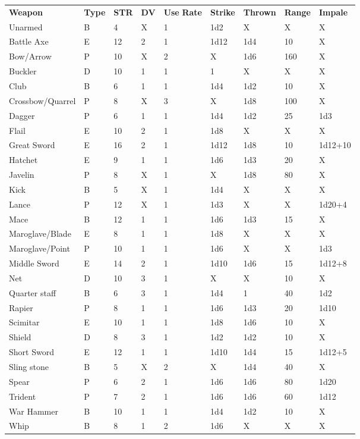 \begin{tcolorbox}[breakable,boxrule=0pt,title=\textbf{Weapon Effects}]
\begin{tabular}{l l l l l l l l l}
\textbf{Weapon} & \textbf{Type} & \textbf{STR} & \textbf{DV} & \textbf{Use} \textbf{Rate} & \textbf{Strike} & \textbf{Thrown} & \textbf{Range} & \textbf{Impale}\\
Unarmed & B & 4 & X & 1 & 1d2 & X & X & X\\
Battle Axe & E & 12 & 2 & 1 & 1d12 & 1d4 & 10 & X\\
Bow/Arrow & P & 10 & X & 2 & X & 1d6 & 160 & X\\
Buckler & D & 10 & 1 & 1 & 1 & X & X & X\\
Club & B & 6 & 1 & 1 & 1d4 & 1d2 & 10 & X\\
Crossbow/Quarrel & P & 8 & X & 3 & X & 1d8 & 100 & X\\
Dagger & P & 6 & 1 & 1 & 1d4 & 1d2 & 25 & 1d3\\
Flail & E & 10 & 2 & 1 & 1d8 & X & X & X\\
Great Sword & E & 16 & 2 & 1 & 1d12 & 1d8 & 10 & 1d12+10\\
Hatchet & E & 9 & 1 & 1 & 1d6 & 1d3 & 20 & X\\
Javelin & P & 8 & X & 1 & X & 1d8 & 80 & X\\
Kick & B & 5 & X & 1 & 1d4 & X & X & X\\
Lance & P & 12 & X & 1 & 1d3 & X & X & 1d20+4\\
Mace & B & 12 & 1 & 1 & 1d6 & 1d3 & 15 & X\\
Maroglave/Blade & E & 8 & 1 & 1 & 1d8 & X & X & X\\
Maroglave/Point & P & 10 & 1 & 1 & 1d6 & X & X & 1d3\\
Middle Sword & E & 14 & 2 & 1 & 1d10 & 1d6 & 15 & 1d12+8\\
Net & D & 10 & 3 & 1 & X & X & 10 & X\\
Quarter staff & B & 6 & 3 & 1 & 1d4 & 1 & 40 & 1d2\\
Rapier & P & 8 & 1 & 1 & 1d6 & 1d3 & 20 & 1d10\\
Scimitar & E & 10 & 1 & 1 & 1d8 & 1d6 & 10 & X\\
Shield & D & 8 & 3 & 1 & 1d2 & 1d2 & 10 & X\\
Short Sword & E & 12 & 1 & 1 & 1d10 & 1d4 & 15 & 1d12+5\\
Sling stone & B & 5 & X & 2 & X & 1d4 & 40 & X\\
Spear & P & 6 & 2 & 1 & 1d6 & 1d6 & 80 & 1d20\\
Trident & P & 7 & 2 & 1 & 1d6 & 1d6 & 60 & 1d12\\
War Hammer & B & 10 & 1 & 1 & 1d4 & 1d2 & 10 & X\\
Whip & B & 8 & 1 & 2 & 1d6 & X & X & X\\
\end{tabular}
\end{tcolorbox}
